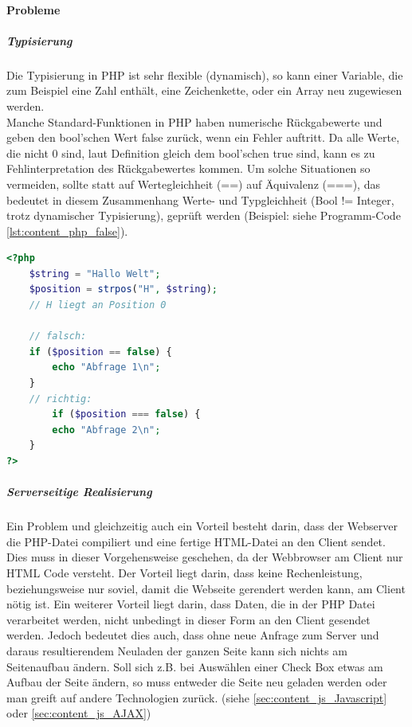 \paragraph{Probleme}
\subparagraph{Typisierung} 
Die Typisierung in PHP ist sehr flexible (dynamisch), so kann einer Variable, die zum Beispiel eine Zahl enthält, 
eine Zeichenkette, oder ein Array neu zugewiesen werden. \\
Manche Standard-Funktionen in PHP haben numerische Rückgabewerte und geben den bool'schen Wert false zurück, 
wenn ein Fehler auftritt. Da alle Werte, die nicht 0 sind, laut Definition gleich dem bool'schen true sind, 
kann es zu Fehlinterpretation des Rückgabewertes kommen. Um solche Situationen so vermeiden, sollte statt auf Wertegleichheit (==) auf Äquivalenz (===), das bedeutet in diesem Zusammenhang Werte- und Typgleichheit (Bool != Integer, trotz dynamischer Typisierung), geprüft werden (Beispiel: siehe Programm-Code \ref{lst:content_php_false}).
\begin{lstlisting}[style=custom, language=PHP,  caption={false},label={lst:content_php_false}]
<?php 
	$string = "Hallo Welt";
	$position = strpos("H", $string); 
	// H liegt an Position 0
	
	// falsch:
	if ($position == false) {
		echo "Abfrage 1\n";
	}
	// richtig:
		if ($position === false) {
		echo "Abfrage 2\n";
	}
?>
\end{lstlisting}
\subparagraph{Serverseitige Realisierung}
Ein Problem und gleichzeitig auch ein Vorteil besteht darin, dass der Webserver die PHP-Datei compiliert 
und eine fertige HTML-Datei an den Client sendet. Dies muss in dieser Vorgehensweise geschehen, da der Webbrowser am Client nur HTML Code versteht.
Der Vorteil liegt darin, dass keine Rechenleistung, beziehungsweise nur soviel, damit die Webseite gerendert werden kann, am Client nötig ist. Ein weiterer Vorteil liegt darin, dass Daten, die in der PHP Datei verarbeitet werden, nicht unbedingt in dieser Form an den Client gesendet werden. 
Jedoch bedeutet dies auch, dass ohne neue Anfrage zum Server und 
daraus resultierendem Neuladen der ganzen Seite kann sich nichts am Seitenaufbau ändern. 
Soll sich z.B. bei Auswählen einer Check Box etwas am Aufbau der Seite ändern, 
so muss entweder die Seite neu geladen werden oder man greift auf andere Technologien zurück. 
(siehe \ref{sec:content_js_Javascript} oder \ref{sec:content_js_AJAX})
